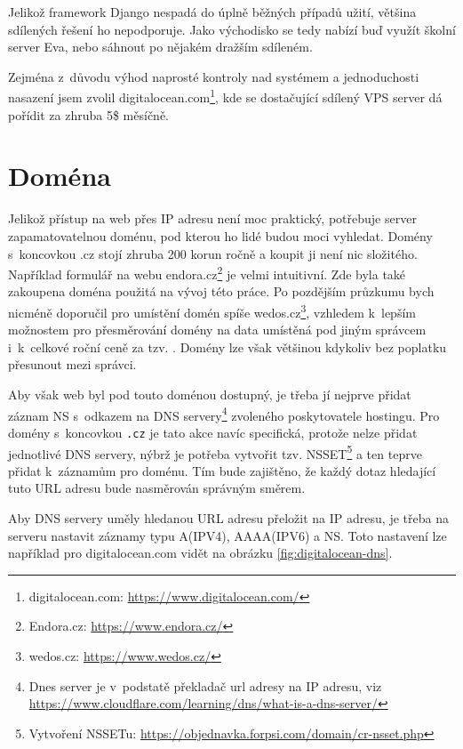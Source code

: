 Jelikož framework Django nespadá do úplně běžných případů užití, většina sdílených řešení ho nepodporuje. Jako východisko se tedy nabízí buď využít školní server Eva, nebo sáhnout po nějakém dražším sdíleném.
\par Zejména z~důvodu výhod naprosté kontroly nad systémem a jednoduchosti nasazení jsem zvolil digitalocean.com\footnote{digitalocean.com: \url{https://www.digitalocean.com/}}, kde se dostačující sdílený VPS server dá pořídit za zhruba 5\$ měsíčně.

\section{Doména}
Jelikož přístup na web přes IP adresu není moc praktický, potřebuje server zapamatovatelnou doménu, pod kterou ho lidé budou moci vyhledat. Domény s~koncovkou .cz stojí zhruba 200 korun ročně a koupit ji není nic složitého. Například formulář na webu endora.cz\footnote{Endora.cz: \url{https://www.endora.cz/}} je velmi intuitivní. Zde byla také zakoupena doména použitá na vývoj této práce. Po pozdějším průzkumu bych nicméně doporučil pro umístění domén spíše wedos.cz\footnote{wedos.cz: \url{https://www.wedos.cz/}}, vzhledem k~lepším možnostem pro přesměrování domény na data umístěná pod jiným správcem i~k~celkové roční ceně za tzv. . Domény lze však většinou kdykoliv bez poplatku přesunout mezi správci.  
\par Aby však web byl pod touto doménou dostupný, je třeba jí nejprve přidat záznam NS s~odkazem na DNS servery\footnote{Dnes server je v~podstatě překladač url adresy na IP adresu, viz \url{https://www.cloudflare.com/learning/dns/what-is-a-dns-server/}} zvoleného poskytovatele hostingu. Pro domény s~koncovkou \texttt{.cz} je tato akce navíc specifická, protože nelze přidat jednotlivé DNS servery, nýbrž je potřeba vytvořit tzv. NSSET\footnote{Vytvoření NSSETu: \url{https://objednavka.forpsi.com/domain/cr-nsset.php}} a ten teprve přidat k~záznamům pro doménu. Tím bude zajištěno, že každý dotaz hledající tuto URL adresu bude nasměrován správným směrem.

\par Aby DNS servery uměly hledanou URL adresu přeložit na IP adresu, je třeba na serveru nastavit záznamy typu A(IPV4), AAAA(IPV6) a NS. Toto nastavení lze například pro digitalocean.com vidět na obrázku \ref{fig:digitalocean-dns}.


